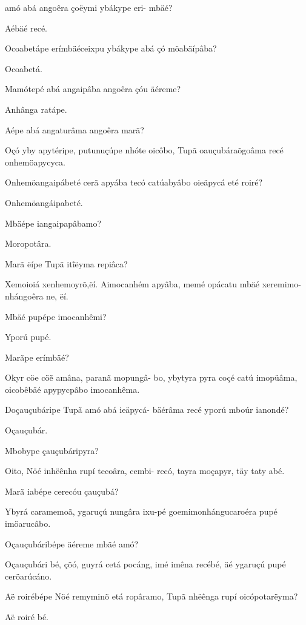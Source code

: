 \documentclass[openany,titlepage,12pt]{book}
\begin{document}
\begin{altereven}
    amó abá angoêra çoëymi ybákype eri-\newline
    mbäé?
    \item Aébäé recé.
    \item Ocoabetápe erímbäéceixpu ybákype abá
    çó möabäípâba?
    \item Ocoabetá.
    \item Mamótepé abá angaipâba angoêra çóu äéreme?
    \item Anhânga ratápe.
    \item Aépe abá angaturâma angoêra marã?
    \item Oçó yby apytéripe, putunuçúpe nhóte
    oicôbo, Tupã oauçubáraõgoâma recé\\
    onhemöapycyca.
    \item Onhemöangaipábeté cerã apyába tecó\newpage
    catúabyâbo oieäpycá eté roiré?
    \item Onhemöangáipabeté.
    \item Mbäépe iangaipapâbamo?
    \item Moropotâra.
    \item Marã ëípe Tupã itĩëyma repiâca?
    \item Xemoioiá xenhemoyrõ,ëí. Aimocanhém
    apyâba, memé opácatu mbäé xeremimo-
    nhángoêra ne, ëí.
    \item Mbäé pupépe imocanhêmi?
    \item Yporú pupé.
    \item Marãpe erímbäé?
    \item Okyr cöe cöẽ amâna, paranã mopungâ-
    bo, ybytyra pyra coçé catú imopüâma,
    oicobêbäé apypycpâbo imocanhêma.
    \item Doçauçubáripe Tupã amó abá ieäpycá-
    bäérâma recé yporú mboúr ianondé?
    \item Oçauçubár.
    \item Mbobype çauçubáripyra?
    \item Oito, Nöé inhëênha rupí tecoâra, cembi-
    recó, tayra moçapyr, täy taty abé.
    \item Marã iabépe cerecóu çauçubá?
    \item Ybyrá caramemoã, ygaruçú nungâra
    ixu-pé goemimonhángucaroéra pupé imöarucâbo.
    \item Oçauçubáribépe äéreme mbäé amó?
    \item Oçauçubári bé, çöó, guyrá cetá pocáng,
    imé imêna recébé, äé ygaruçú pupé ceröarúcáno.
    \newpage
    \item Aë roirébépe Nöé remyminõ etá ropâramo,
    Tupã nhëênga rupí oicópotarëyma?
    \item Aë roiré bé.
\end{altereven}
\end{document}
